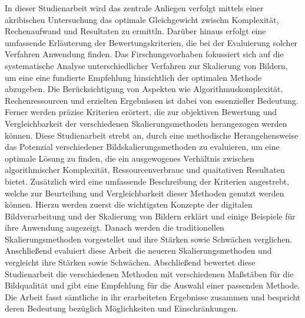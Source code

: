     In dieser Studienarbeit wird das zentrale Anliegen verfolgt mittels einer akribischen Untersuchung das optimale Gleichgewicht zwischn Komplexität, Rechenaufwand und Resultaten zu ermittln. 
    Darüber hinaus erfolgt eine umfassende Erläuterung der Bewertungskriterien, die bei der Evaluierung solcher Verfahren Anwendung finden. 
    Das Firschungsvorhaben fokussiert sich auf die systematische Analyse unterschiedlicher Verfahren zur Skalierung von Bildern, um eine eine fundierte Empfehlung hinsichtlich der optimalen Methode abzugeben. 
    Die Berücksichtigung von Aspekten wie Algorithmuskomplexität, Rechenressourcen und erzielten Ergebnissen ist dabei von essenzieller Bedeutung. 
    Ferner werden präzise Kriterien erörtert, die zur objektiven Bewertung und Vergleichbarkeit der verschiedenen Skalierungsmethoden herangezogen werden können.
    Diese Studienarbeit strebt an, durch eine methodische Herangehensweise das Potenzial verschiedener Bildskalierungsmethoden zu evaluieren, um eine optimale Lösung zu finden, die ein ausgewogenes Verhältnis zwischen algorithmischer Komplexität, Ressourcenverbrauc und quaitativen Resultaten bietet. 
    Zusätzlich wird eine umfassende Beschreibung der Kriterien angestrebt, welche zur Beurteilung und Vergleichbarkeit dieser Methoden genutzt werden können.
    Hierzu werden zuerst die wichtigsten Konzepte der digitalen Bildverarbeitung und der Skalierung von Bildern erklärt und einige Beispiele für ihre Anwendung augezeigt. 
    Danach werden die traditionellen Skalierungsmethoden vorgestellet und  ihre Stärken sowie Schwächen verglichen. 
    Anschließend evaluiert diese Arbeit die neueren Skalierungsmethoden und vergleicht ihre Stärken sowie Schwächen. 
    Abschließend bewertet diese Studienarbeit die verschiedenen Methoden mit verschiedenen Maßstäben für die Bildqualität und gibt eine Empfehlung für die Auswahl einer passenden Methode. 
    Die Arbeit fasst sämtliche in ihr erarbeiteten Ergebnisse zusammen und bespricht deren Bedeutung bezüglich Möglichkeiten und Einschränkungen.
    \newpage
